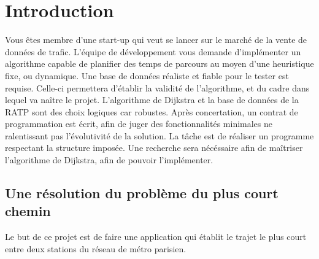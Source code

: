 \documentclass[9pts]{article}
\renewcommand{\headrulewidth}{0pt}
\begin{document}
\pagebreak
\renewcommand{\headrulewidth}{0.5pt}
\fancyfoot[C]{\thepage}

\section{Introduction}
Vous êtes membre d'une start-up qui veut se lancer sur le marché de la vente de données de trafic.
L'équipe de développement vous demande d'implémenter un algorithme capable de planifier des temps de parcours au moyen d'une heuristique fixe, ou dynamique.
Une base de données réaliste et fiable pour le tester est requise. Celle-ci permettera d'établir la validité de l'algorithme, et du cadre dans lequel va naître le projet.
L'algorithme de Dijkstra et la base de données de la RATP sont des choix logiques car robustes.
Après concertation, un contrat de programmation est écrit, afin de juger des fonctionnalités minimales ne ralentissant pas l'évolutivité de la solution.
La tâche est de réaliser un programme respectant la structure imposée. Une recherche sera nécéssaire afin de maîtriser l'algorithme de Dijkstra, afin de pouvoir l'implémenter.

\subsection{Une résolution du problème du plus court chemin}
Le but de ce projet est de faire une application qui établit le trajet le plus court entre deux stations du réseau de métro parisien.
\end{document}
